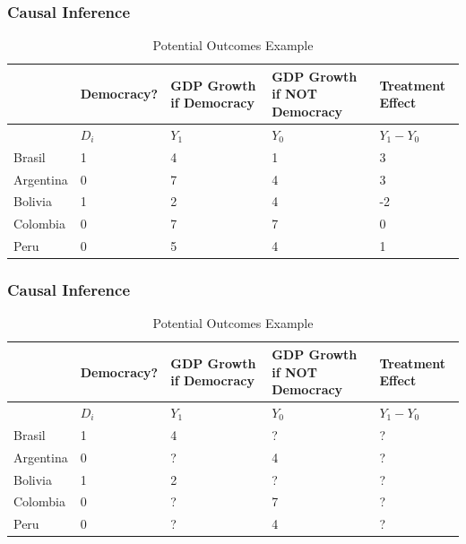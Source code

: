 \documentclass[xcolor=x11names,compress]{beamer}\usepackage[]{graphicx}\usepackage[]{color}
\renewcommand{\(}{\begin{columns}}
\renewcommand{\)}{\end{columns}}
\newcommand{\<}[1]{\begin{column}{#1}}
\renewcommand{\>}{\end{column}}
\begin{document}
\begin{frame}
\frametitle{Causal Inference}
\footnotesize
\begin{table}[htbp]
  \centering
  \caption{Potential Outcomes Example}
    \begin{tabular}{|p{1.8cm}|p{1.8cm}|p{2cm}|p{2cm}|p{2cm}|}
    \hline
          & \multicolumn{1}{p{1.8cm}|}{Democracy?} & \multicolumn{1}{p{2cm}|}{GDP Growth if Democracy} & \multicolumn{1}{p{2.2cm}|}{GDP Growth if NOT Democracy} &  Treatment Effect \bigstrut\\
    \hline
          & \multicolumn{1}{p{1.8cm}|}{$D_i$} & \multicolumn{1}{p{2cm}|}{$Y_1$} & \multicolumn{1}{p{2.2cm}|}{$Y_0$} & \multicolumn{1}{p{1.8cm}|}{$Y_{1} - Y_{0}$} \bigstrut\\
    \hline
    Brasil & 1 & 4     & 1      & 3 \bigstrut\\
    \hline
    Argentina & 0 & 7    & 4      & 3 \bigstrut\\
    \hline
    Bolivia & 1 & 2     & 4     & -2 \bigstrut\\
    \hline
    Colombia & 0 &  7   & 7    & 0 \bigstrut\\
    \hline
    Peru & 0 & 5     & 4     & 1 \bigstrut\\
\hline
    \end{tabular}%
  \label{tab:addlabel}%
\end{table}%
\normalsize
\end{frame}

\begin{frame}
\frametitle{Causal Inference}
\footnotesize
\begin{table}[htbp]
  \centering
  \caption{Potential Outcomes Example}
    \begin{tabular}{|p{1.8cm}|p{1.8cm}|p{2cm}|p{2cm}|p{2cm}|}
    \hline
          & \multicolumn{1}{p{1.8cm}|}{Democracy?} & \multicolumn{1}{p{2cm}|}{GDP Growth if Democracy} & \multicolumn{1}{p{2.2cm}|}{GDP Growth if NOT Democracy} & Treatment Effect \bigstrut\\
    \hline
          & \multicolumn{1}{p{1.8cm}|}{$D_i$} & \multicolumn{1}{p{2cm}|}{$Y_1$} & \multicolumn{1}{p{2.2cm}|}{$Y_0$} & \multicolumn{1}{p{1.8cm}|}{$Y_{1} - Y_{0}$} \bigstrut\\
    \hline
    Brasil & 1 & 4     & ?      & ? \bigstrut\\
    \hline
    Argentina & 0 & ?    & 4      & ? \bigstrut\\
    \hline
    Bolivia & 1 & 2     & ?     & ? \bigstrut\\
    \hline
    Colombia & 0 &  ?   & 7    & ? \bigstrut\\
    \hline
    Peru & 0 & ?     & 4     & ? \bigstrut\\
\hline
    \end{tabular}%
  \label{tab:addlabel}%
\end{table}%
\normalsize
\end{frame}
\end{document}
